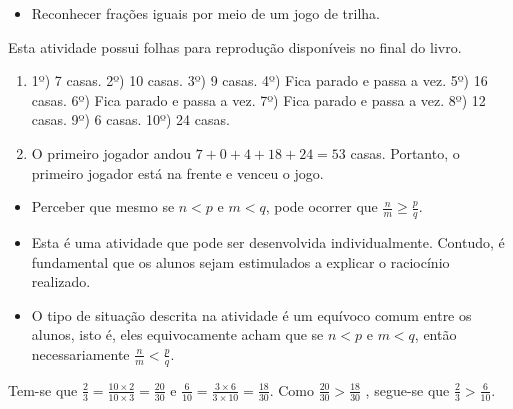 \clearpage


\begin{atividade}\label{chap4-ativ20}
\objetivos
\begin{itemize} %
    \item       Reconhecer frações iguais por meio de um jogo de trilha.
\end{itemize} %

\discussoes
  Esta atividade possui folhas para reprodução disponíveis no final do
livro.

\solucao
\begin{enumerate}
\item 1º) 7 casas. 2º) 10 casas. 3º) 9 casas. 4º) Fica parado e passa a vez. 5º) 16 casas. 6º) Fica parado e passa a vez. 7º) Fica parado e passa a vez. 8º) 12 casas. 9º) 6 casas.
10º) 24 casas.

\item O primeiro jogador andou $7 + 0 + 4 + 18 + 24 = 53$ casas. Portanto, o primeiro jogador está na frente e venceu o jogo.
\end{enumerate}
\end{atividade}

\anotacoes

\begin{atividade}\label{chap4-ativ21}
\objetivos
\begin{itemize} %
    \item       Perceber que mesmo se       $n < p$       e       $m < q$, pode
ocorrer que       $\frac{n}{m} \geq \frac{p}{q}$.
\end{itemize} %

\discussoes
\begin{itemize} %
    \item       Esta é uma atividade que pode ser desenvolvida individualmente.
Contudo, é fundamental que os alunos sejam estimulados a explicar o raciocínio
realizado.
    \item       O tipo de situação descrita na atividade é um equívoco comum
entre os alunos, isto é, eles equivocamente acham que se       $n < p$       e
    $m < q$, então necessariamente       $\frac{n}{m} < \frac{p}{q}$.
\end{itemize} %

\solucao
  Tem-se que   $\frac{2}{3} = \frac{10 \times 2}{10 \times 3} = \frac{20}{30}$
e
  $\frac{6}{10} = \frac{3 \times 6}{3 \times 10} = \frac{18}{30}$.
  Como   $\frac{20}{30} > \frac{18}{30}$  , segue-se que   $\frac{2}{3} >
\frac{6}{10}$.
\end{atividade}

